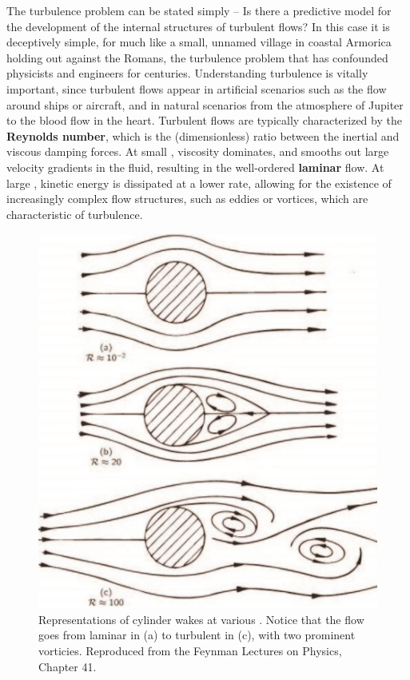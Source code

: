 The turbulence problem can be stated simply -- Is there a predictive model for the development of the internal structures of turbulent flows? In this case it is deceptively simple, for much like a small, unnamed village in coastal Armorica holding out against the Romans, the turbulence problem that has confounded physicists and engineers for centuries. Understanding turbulence is vitally important, since turbulent flows appear in artificial scenarios such as the flow around ships or aircraft, and in natural scenarios from the atmosphere of Jupiter to the blood flow in the heart.  Turbulent flows are typically characterized by the {\bf Reynolds number}, which is the (dimensionless) ratio between the inertial and viscous damping forces. At small \ReN, viscosity dominates, and smooths out large velocity gradients in the fluid, resulting in the well-ordered {\bf laminar} flow. At large \ReN, kinetic energy is dissipated at a lower rate, allowing for the existence of increasingly complex flow structures, such as eddies or vortices, which are characteristic of turbulence.  
\begin{figure}[h]
\centerline{
\includegraphics[scale=0.4]{Figs/CylinderReFlow}}
\caption{Representations of cylinder wakes at various \ReN. Notice that the flow goes from laminar in (a) to turbulent in (c), with two prominent vorticies. Reproduced from the Feynman Lectures on Physics, Chapter 41.}\label{fig:cylinderWake}
\end{figure}

